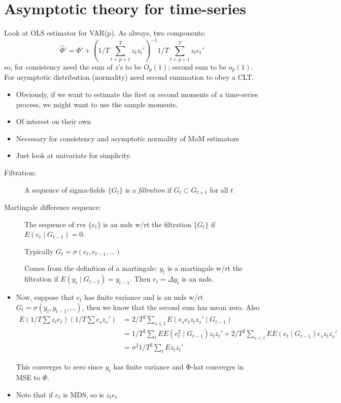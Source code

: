 \section{Asymptotic theory for time-series}

Look at OLS estimator for VAR(p). As always, two components:
\[\hat Φ' = Φ' + (1/T ∑_{t=p+1}^T z_t z_t')^{-1} 1/T
∑_{t=p+1}^T z_t e_t'\] so, for consistency need the sum of $z$'s to be
$O_p(1)$; second sum to be $o_p(1)$. For asymptotic distribution
(normality) need second summation to obey a CLT.

\begin{itemize}
\item Obviously, if we want to estimate the first or second moments of
  a time-series process, we might want to use the sample moments.
\item Of interest on their own
\item Necessary for consistency and asymptotic normality of MoM
  estimators
\item Just look at univariate for simplicity.
\end{itemize}

\begin{description}
\item[Filtration:]
  A sequence of sigma-fields $\{G_t\}$ is a \emph{filtration} if $G_t
  ⊂ G_{t+1}$ for all $t$
\item[Martingale difference sequence:]
  The sequence of rvs $\{e_t\}$ is an mds w/rt the filtration $\{G_t\}$ if
  $E(e_t ∣ G_{t-1}) = 0$.

  Typically $G_t = σ(e_t, e_{t-1},…)$

  Comes from the definition of a martingale: $y_t$ is a martingale
  w/rt the filtration if $E(y_t ∣ G_{t-1}) = y_{t-1}$. Then $e_t =
  Δy_t$ is an mds.
\end{description}

\begin{itemize}
\item Now, suppose that $e_t$ has finite variance and is an mds w/rt
  $G_t = σ(y_t, y_{t-1},…)$, then we know that the second sum has mean
  zero. Also
  \begin{align*}
    E (1/T ∑ z_t e_t)(1/T ∑ e_s z_s')
    &= 2/T^2 ∑_{s ≤ t} E(e_s e_t z_t z_s' ∣ G_{t-1}) \\
    &= 1/T^2 ∑_t E E( e_t^2 ∣ G_{t-1}) z_t z_t' + 2/T^2 ∑_{s < t} E E(
    e_t ∣ G_{t-1}) e_s z_t z_s' \\
    &= σ^2 1/T^2 ∑_t E z_t z_t'
  \end{align*}

  This converges to zero since $y_t$ has finite variance and Φ-hat
  converges in MSE to $Φ$.
\item Note that if $e_t$ is MDS, so is $z_t e_t$
\end{itemize}

